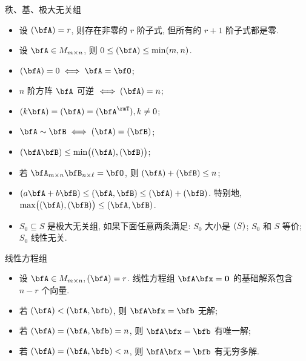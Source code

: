 \documentclass[aspectratio=169,handout]{ctexbeamer}
\let\rank\relax\DeclareMathOperator\rank{R}
\begin{document}
\begin{frame}{秩、基、极大无关组}
	\onslide<+->
	\begin{itemize}
		\item 设 $\rank(\bfA)=r$, 则存在非零的 $r$ 阶子式, 但所有的 $r+1$ 阶子式都是零.
		\item 设 $\bfA\in M_{m\times n}$, 则 $0\le \rank(\bfA)\le \min(m,n)$.
		\item $\rank(\bfA)=0\iff \bfA=\bfO$;
		\item $n$ 阶方阵 $\bfA$ 可逆 $\iff \rank(\bfA)=n$;
		\item $\rank(k\bfA)=\rank(\bfA)=\rank(\bfA^\rmT), k\neq 0$;
		\item $\bfA\sim\bfB\iff \rank(\bfA)=\rank(\bfB)$;
		\item $\rank(\bfA\bfB)\le \min\bigl(\rank(\bfA),\rank(\bfB)\bigr)$;
		\item 若 $\bfA_{m\times n}\bfB_{n\times\ell}=\bfO$, 则 $\rank(\bfA)+\rank(\bfB)\le n$;
		\item $\rank(a\bfA+b\bfB)\le \rank(\bfA,\bfB)\le \rank(\bfA)+\rank(\bfB)$.
		特别地, $\max\bigl(\rank(\bfA),\rank(\bfB)\bigr)\le \rank(\bfA,\bfB)$.
		\item $S_0\subseteq S$ 是极大无关组, 如果下面任意两条满足: $S_0$ 大小是 $\rank(S)$; $S_0$ 和 $S$ 等价; $S_0$ 线性无关.
	\end{itemize}
\end{frame}


\begin{frame}{线性方程组}
	\onslide<+->
	\begin{itemize}
		\item 设 $\bfA\in M_{m\times n}, \rank(\bfA)=r$.
		线性方程组 $\bfA\bfx={\bf0}$ 的基础解系包含 $n-r$ 个向量.
		\item 若 $\rank(\bfA)<\rank(\bfA,\bfb)$, 则 $\bfA \bfx=\bfb$ 无解;
		\item 若 $\rank(\bfA)=\rank(\bfA,\bfb)=n$, 则 $\bfA \bfx=\bfb$ 有唯一解;
		\item 若 $\rank(\bfA)=\rank(\bfA,\bfb)<n$, 则 $\bfA \bfx=\bfb$ 有无穷多解.
	\end{itemize}
\end{frame}
\end{document}
